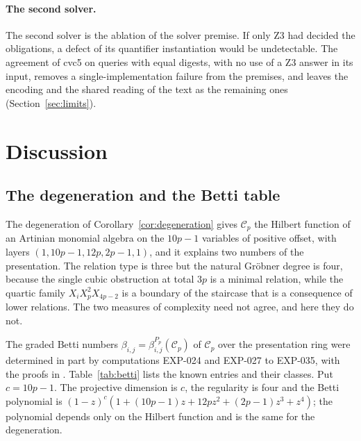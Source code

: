\documentclass[11pt]{article}
\theoremstyle{definition}
\theoremstyle{remark}
\newcommand{\Cfiber}{\mathcal{C}}
\begin{document}
\paragraph{The second solver.} The second solver is the ablation of the solver premise. If only Z3
had decided the obligations, a defect of its quantifier instantiation would be undetectable. The
agreement of cvc5 on queries with equal digests, with no use of a Z3 answer in its input, removes
a single-implementation failure from the premises, and leaves the encoding and the shared reading of
the text as the remaining ones (Section~\ref{sec:limits}).

\section{Discussion}\label{sec:discussion}

\subsection{The degeneration and the Betti table}

The degeneration of Corollary~\ref{cor:degeneration} gives $\Cfiber_p$ the Hilbert function of an
Artinian monomial algebra on the $10p-1$ variables of positive offset, with layers
$(1,10p-1,12p,2p-1,1)$, and it explains two numbers of the presentation. The relation type is three
but the natural Gr\"obner degree is four, because the single cubic obstruction at total $3p$
is a minimal relation, while the quartic family $X_iX_p^2X_{4p-2}$ is a boundary of the
staircase that is a consequence of lower relations. The two measures of complexity need not
agree, and here they do not.

The graded Betti numbers $\beta_{i,j}=\beta^{P_p}_{i,j}(\Cfiber_p)$ of $\Cfiber_p$ over the presentation
ring were determined in part by computations EXP-024 and EXP-027 to EXP-035, with the proofs in
\cite{SantibanezLeal2026}. Table~\ref{tab:betti} lists the known entries and their classes.
Put $c=10p-1$. The projective dimension is $c$, the regularity is four and the Betti polynomial is
$(1-z)^c(1+(10p-1)z+12pz^2+(2p-1)z^3+z^4)$; the polynomial depends only on the Hilbert function
and is the same for the degeneration.
\end{document}
